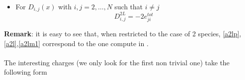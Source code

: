 \documentclass[10pt]{article}
\numberwithin{equation}{section}
\numberwithin{equation}{subsection}
\begin{document}
\begin{itemize}

\item For $D_{i,j}(x)$ with $i,j=2,\ldots,N$ such that $i\neq j$
\begin{equation}
D_{i,j}^{2L}=-2e_{ji}^{tot}
\end{equation}
\end{itemize}
\textbf{Remark}: it is easy to see that, when restricted to the case of 2 species,  \eqref{a2lp},\eqref{a2l},\eqref{a2lm1} correspond to the one compute in \cite{frassek2020eigenstates}. \\ \\
The interesting charges (we only look for the first non trivial one) take the following form  
\end{document}

